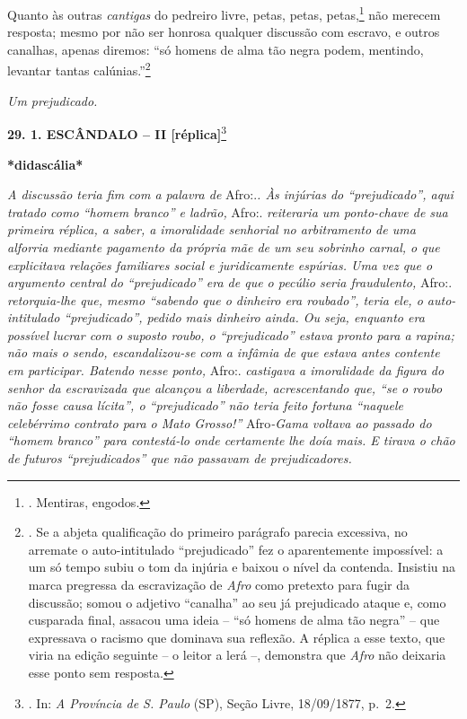 Quanto às outras \emph{cantigas} do pedreiro livre, petas, petas,
petas,\footnote{. Mentiras, engodos.} não merecem resposta; mesmo por
não ser honrosa qualquer discussão com escravo, e outros canalhas,
apenas diremos: ``só homens de alma tão negra podem, mentindo, levantar
tantas calúnias.''\footnote{. Se a abjeta qualificação do primeiro
  parágrafo parecia excessiva, no arremate o auto-intitulado
  ``prejudicado'' fez o aparentemente impossível: a um só tempo subiu o
  tom da injúria e baixou o nível da contenda. Insistiu na marca
  pregressa da escravização de \emph{Afro} como pretexto para fugir da
  discussão; somou o adjetivo ``canalha'' ao seu já prejudicado ataque
  e, como cusparada final, assacou uma ideia -- ``só homens de alma tão
  negra'' -- que expressava o racismo que dominava sua reflexão. A
  réplica a esse texto, que viria na edição seguinte -- o leitor a lerá
  --, demonstra que \emph{Afro} não deixaria esse ponto sem resposta.}

\emph{Um prejudicado.}

\textbf{29. 1. ESCÂNDALO -- II {[}réplica{]}}\footnote{. In: \emph{A
  Província de S. Paulo} (SP), Seção Livre, 18/09/1877, p.~2.}

\textbf{*didascália*}

\emph{A discussão teria fim com a palavra de} Afro:.\emph{. Às injúrias
do ``prejudicado'', aqui tratado como ``homem branco'' e ladrão,} Afro:.
\emph{reiteraria um ponto-chave de sua primeira réplica, a saber, a
imoralidade senhorial no arbitramento de uma alforria mediante pagamento
da própria mãe de um seu sobrinho carnal, o que explicitava relações
familiares social e juridicamente espúrias. Uma vez que o argumento
central do ``prejudicado'' era de que o pecúlio seria fraudulento,}
Afro:. \emph{retorquia-lhe que, mesmo ``sabendo que o dinheiro era
roubado'', teria ele, o auto-intitulado ``prejudicado'', pedido mais
dinheiro ainda. Ou seja, enquanto era possível lucrar com o suposto
roubo, o ``prejudicado'' estava pronto para a rapina; não mais o sendo,
escandalizou-se com a infâmia de que estava antes contente em
participar. Batendo nesse ponto,} Afro:. \emph{castigava a imoralidade
da figura do senhor da escravizada que alcançou a liberdade,
acrescentando que, ``se o roubo não fosse causa lícita'', o
``prejudicado'' não teria feito fortuna ``naquele celebérrimo contrato
para o Mato Grosso!''} Afro\emph{-Gama voltava ao passado do ``homem
branco'' para contestá-lo onde certamente lhe doía mais. E tirava o chão
de futuros ``prejudicados'' que não passavam de prejudicadores.}

